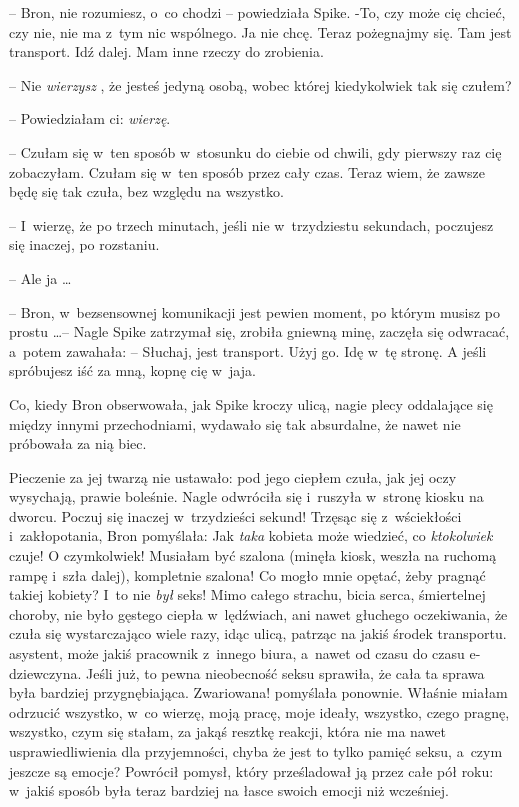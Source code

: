 \documentclass[oneside,polish,11pt,rmheadings]{mwbk}
\begin{document}
-- Bron, nie rozumiesz, o~co chodzi -- powiedziała Spike. -To, czy może cię chcieć, czy nie, nie ma z~tym nic wspólnego. Ja nie chcę. Teraz pożegnajmy się. Tam jest transport. Idź dalej. Mam inne rzeczy do zrobienia. 

-- Nie \textit{wierzysz }, że jesteś jedyną osobą, wobec której kiedykolwiek tak się czułem? 

-- Powiedziałam ci: \textit{wierzę}. 

-- Czułam się w~ten sposób w~stosunku do ciebie od chwili, gdy pierwszy raz cię zobaczyłam. Czułam się w~ten sposób przez cały czas. Teraz wiem, że zawsze będę się tak czuła, bez względu na wszystko. 

-- I~wierzę, że po trzech minutach, jeśli nie w~trzydziestu sekundach, poczujesz się inaczej, po rozstaniu. 

-- Ale ja \ldots  

-- Bron, w~bezsensownej komunikacji jest pewien moment, po którym musisz po prostu \ldots  -- Nagle Spike zatrzymał się, zrobiła gniewną minę, zaczęła się odwracać, a~potem zawahała: -- Słuchaj, jest transport. Użyj go. Idę w~tę stronę. A jeśli spróbujesz iść za mną, kopnę cię w~jaja. 

Co, kiedy Bron obserwowała, jak Spike kroczy ulicą, nagie plecy oddalające się między innymi przechodniami, wydawało się tak absurdalne, że nawet nie próbowała za nią biec. 

Pieczenie za jej twarzą nie ustawało: pod jego ciepłem czuła, jak jej oczy wysychają, prawie boleśnie. Nagle odwróciła się i~ruszyła w~stronę kiosku na dworcu. Poczuj się inaczej w~trzydzieści sekund! Trzęsąc się z~wściekłości i~zakłopotania, Bron pomyślała: Jak \textit{taka }kobieta może wiedzieć, co \textit{ktokolwiek} czuje! O czymkolwiek! Musiałam być szalona (minęła kiosk, weszła na ruchomą rampę i~szła dalej), kompletnie szalona! Co mogło mnie opętać, żeby pragnąć takiej kobiety? I~to nie \textit{był }seks! Mimo całego strachu, bicia serca, śmiertelnej choroby, nie było gęstego ciepła w~lędźwiach, ani nawet głuchego oczekiwania, że czuła się wystarczająco wiele razy, idąc ulicą, patrząc na jakiś środek transportu. asystent, może jakiś pracownik z~innego biura, a~nawet od czasu do czasu e-dziewczyna. Jeśli już, to pewna nieobecność seksu sprawiła, że cała ta sprawa była bardziej przygnębiająca. Zwariowana! pomyślała ponownie. Właśnie miałam odrzucić wszystko, w~co wierzę, moją pracę, moje ideały, wszystko, czego pragnę, wszystko, czym się stałam, za jakąś resztkę reakcji, która nie ma nawet usprawiedliwienia dla przyjemności, chyba że jest to tylko pamięć seksu, a~czym jeszcze są emocje? Powrócił pomysł, który prześladował ją przez całe pół roku: w~jakiś sposób była teraz bardziej na łasce swoich emocji niż wcześniej. 
\end{document}
